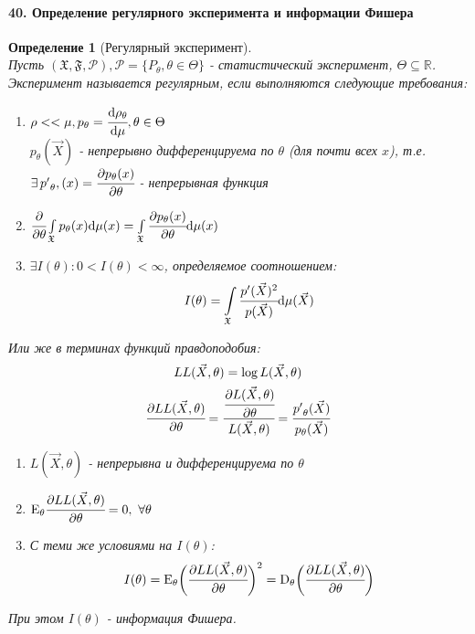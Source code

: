 \documentclass[titlepage]{article}
\newcommand{\sP}{\mathcal{P}}
\newcommand{\sF}{\mathfrak{F}}
\newcommand{\sX}{\mathfrak{X}}
\newcommand{\sE}{\mathrm{E}}
\newcommand{\sD}{\mathrm{D}}
\newcommand{\R}{\mathbb{R}} %
\newtheorem{definition}{Определение}
\begin{document}
\paragraph{40. Определение регулярного эксперимента и информации Фишера}
\begin{definition}[Регулярный эксперимент] ~\\
	Пусть $(\sX,\sF,\sP), \sP = \{P_\theta, \theta \in \Theta\}$ - статистический эксперимент, $\Theta \subseteq \R$.\\
	Эксперимент называется регулярным, если выполняются следующие требования:
	\begin{enumerate}
		\item $\rho << \mu, p_\theta = \cfrac{\mathrm{d}\rho_\theta}{\mathrm{d}\mu}, \theta \in \Theta$\\
			  $p_\theta(\vec X)$ - непрерывно дифференцируема по $\theta$ (для почти всех $x$), т.е.
			  $\exists\, {p'}_\theta, (x) = \cfrac{\partial p_\theta(x)}{\partial\theta}$ - непрерывная функция
		\item $\cfrac{\partial}{\partial\theta}\int\limits_\sX p_\theta(x)\mathrm{d}\mu(x) = \int\limits_\sX \cfrac{\partial p_\theta(x)}{\partial\theta}\mathrm{d}\mu(x)$
		\item $\exists I(\theta): 0 < I(\theta) < \infty$, определяемое соотношением:
		\[I(\theta) = \int\limits_\sX \cfrac{p'(\vec X)^2}{p(\vec X)}\mathrm{d}\mu(\vec X)\]
	\end{enumerate}
	Или же в терминах функций правдоподобия:
	\begin{gather*}
		LL(\vec X, \theta) = \log L(\vec X, \theta)\\
		\cfrac{\partial LL(\vec X, \theta)}{\partial\theta} = \cfrac{\cfrac{\partial L(\vec X, \theta)}{\partial \theta}}{L(\vec X, \theta)} = \cfrac{{p'}_\theta(\vec X)}{p_\theta(\vec X)}
	\end{gather*}
	\begin{enumerate}
		\item $L(\vec X, \theta)$ - непрерывна и дифференцируема по $\theta$
		\item $\sE_\theta\cfrac{\partial LL(\vec X, \theta)}{\partial\theta} = 0,\ \forall \theta$
		\item С теми же условиями на $I(\theta)$:
		\[I(\theta) = \sE_\theta\bigg(\cfrac{\partial LL(\vec X, \theta)}{\partial \theta}\bigg)^2 = \sD_\theta\bigg(\cfrac{\partial LL(\vec X, \theta)}{\partial \theta}\bigg)\]
	\end{enumerate}
	При этом $I(\theta)$ - информация Фишера.
\end{definition}
\end{document}
